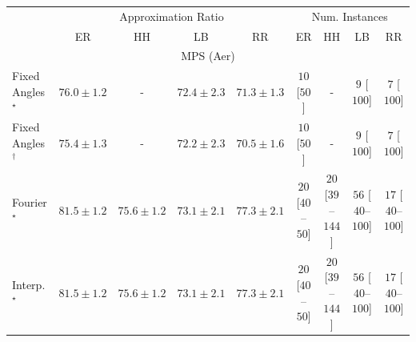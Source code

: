 \begin{tabular}{l|cccc|cccc|}
\toprule
& \multicolumn{4}{c|}{Approximation Ratio} & \multicolumn{4}{c|}{Num. Instances} \\
            & ER & HH & LB & RR & ER & HH & LB & RR \\
\midrule
\multicolumn{9}{c}{\rule{0pt}{8pt}MPS (Aer)} \\
\midrule
Fixed Angles$^\star$ & {\cellcolor[HTML]{8C69B0}} \color[HTML]{F1F1F1} $76.0\pm 1.2$ & {\cellcolor[HTML]{000000}} \color[HTML]{F1F1F1} {\cellcolor{white}} \color{black} - & {\cellcolor[HTML]{99B2D5}} \color[HTML]{000000} $72.4\pm 2.3$ & {\cellcolor[HTML]{A8C3DE}} \color[HTML]{000000} $71.3\pm 1.3$ & {\cellcolor[HTML]{FFF7F3}} \color[HTML]{000000} $10$ [$50$] & {\cellcolor[HTML]{000000}} \color[HTML]{F1F1F1} {\cellcolor{white}} \color{black} - & {\cellcolor[HTML]{FFF7F3}} \color[HTML]{000000} $9$ [$100$] & {\cellcolor[HTML]{FFF7F3}} \color[HTML]{000000} $7$ [$100$] \\
Fixed Angles$^\dagger$ & {\cellcolor[HTML]{8C76B7}} \color[HTML]{F1F1F1} $75.4\pm 1.3$ & {\cellcolor[HTML]{000000}} \color[HTML]{F1F1F1} {\cellcolor{white}} \color{black} - & {\cellcolor[HTML]{9BB6D7}} \color[HTML]{000000} $72.2\pm 2.3$ & {\cellcolor[HTML]{B4CCE2}} \color[HTML]{000000} $70.5\pm 1.6$ & {\cellcolor[HTML]{FFF7F3}} \color[HTML]{000000} $10$ [$50$] & {\cellcolor[HTML]{000000}} \color[HTML]{F1F1F1} {\cellcolor{white}} \color{black} - & {\cellcolor[HTML]{FFF7F3}} \color[HTML]{000000} $9$ [$100$] & {\cellcolor[HTML]{FFF7F3}} \color[HTML]{000000} $7$ [$100$] \\
Fourier$^\star$ & {\cellcolor[HTML]{580356}} \color[HTML]{F1F1F1} $81.5\pm 1.2$ & {\cellcolor[HTML]{8C72B5}} \color[HTML]{F1F1F1} $75.6\pm 1.2$ & {\cellcolor[HTML]{93A5CE}} \color[HTML]{F1F1F1} $73.1\pm 2.1$ & {\cellcolor[HTML]{894FA3}} \color[HTML]{F1F1F1} $77.3\pm 2.1$ & {\cellcolor[HTML]{FFF4F0}} \color[HTML]{000000} $20$ [$40$--$50$] & {\cellcolor[HTML]{FFF4F0}} \color[HTML]{000000} $20$ [$39$--$144$] & {\cellcolor[HTML]{FEECE9}} \color[HTML]{000000} $56$ [$40$--$100$] & {\cellcolor[HTML]{FFF5F1}} \color[HTML]{000000} $17$ [$40$--$100$] \\
Interp.$^\star$ & {\cellcolor[HTML]{580356}} \color[HTML]{F1F1F1} $81.5\pm 1.2$ & {\cellcolor[HTML]{8C72B5}} \color[HTML]{F1F1F1} $75.6\pm 1.2$ & {\cellcolor[HTML]{93A5CE}} \color[HTML]{F1F1F1} $73.1\pm 2.1$ & {\cellcolor[HTML]{894FA3}} \color[HTML]{F1F1F1} $77.3\pm 2.1$ & {\cellcolor[HTML]{FFF4F0}} \color[HTML]{000000} $20$ [$40$--$50$] & {\cellcolor[HTML]{FFF4F0}} \color[HTML]{000000} $20$ [$39$--$144$] & {\cellcolor[HTML]{FEECE9}} \color[HTML]{000000} $56$ [$40$--$100$] & {\cellcolor[HTML]{FFF5F1}} \color[HTML]{000000} $17$ [$40$--$100$] \\

\end{tabular}
